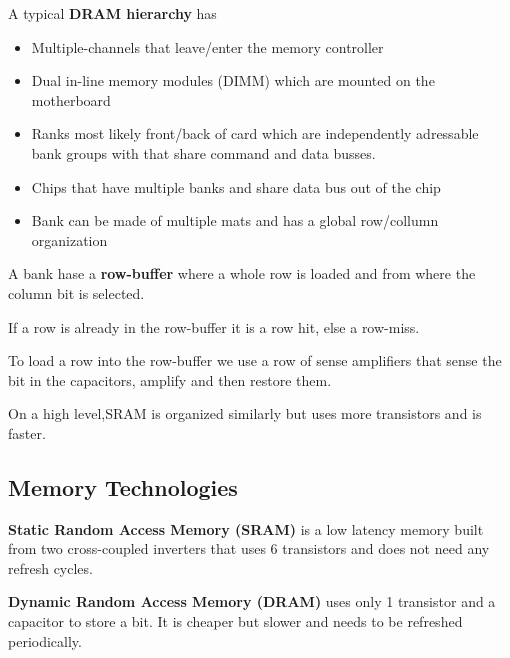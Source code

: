\begin{definition}
	A typical \textbf{DRAM hierarchy} has
	\begin{itemize}
		\item Multiple-channels that leave/enter the memory controller
		\item Dual in-line memory modules (DIMM) which are mounted on the motherboard
		\item Ranks most likely front/back of card which are independently adressable bank groups with that share command and data busses.
		\item Chips that have multiple banks and share data bus out of the chip
		\item Bank can be made of multiple mats and has a global row/collumn organization
	\end{itemize}
\end{definition}

\begin{definition}
	A bank hase a \textbf{row-buffer} where a whole row is loaded and from where the column bit is selected.
\end{definition}

\begin{remark}
	If a row is already in the row-buffer it is a row hit, else a row-miss.
\end{remark}

\begin{remark}
	To load a row into the row-buffer we use a row of sense amplifiers that sense the bit in the capacitors, amplify and then restore them.
\end{remark}

\begin{remark}
	On a high level,SRAM is organized similarly but uses more transistors and is faster.
\end{remark}

\subsection{Memory Technologies}

\begin{definition}
	\textbf{Static Random Access Memory (SRAM)} is a low latency memory built from two cross-coupled inverters that uses 6 transistors and does not need any refresh cycles.
\end{definition}

\begin{definition}
	\textbf{Dynamic Random Access Memory (DRAM)} uses only 1 transistor and a capacitor to store a bit. It is cheaper but slower and needs to be refreshed periodically.
\end{definition}

